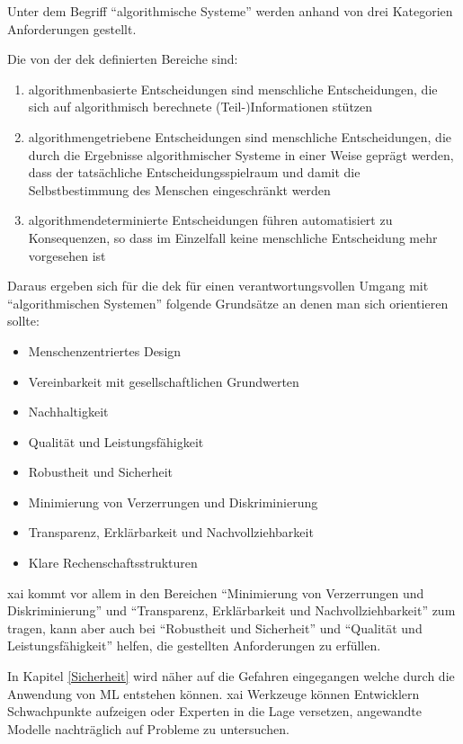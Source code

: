 \documentclass[
  12pt, %
  a4paper, %
  oneside, %
  openany, 
  numbers=noenddot, %
  BCOR=5mm, %
  parskip=half*, %
  thesis, %
]{bfhbook}
\begin{document}
Unter dem Begriff ``algorithmische Systeme'' werden anhand von drei Kategorien Anforderungen gestellt.

 Die von der  \acrshort{dek} definierten Bereiche sind:
 
 \begin{enumerate}
   \item  algorithmenbasierte Entscheidungen sind menschliche Entscheidungen, die sich auf algorithmisch berechnete (Teil-)Informationen stützen
   \item algorithmengetriebene Entscheidungen sind menschliche Entscheidungen, die durch die Ergebnisse algorithmischer Systeme in einer Weise geprägt werden, dass der tatsächliche Entscheidungsspielraum und damit die Selbstbestimmung des Menschen eingeschränkt werden
   \item  algorithmendeterminierte Entscheidungen führen automatisiert zu Konsequenzen, so dass im Einzelfall keine menschliche Entscheidung mehr vorgesehen ist
\end{enumerate}

Daraus ergeben sich für die \acrlong{dek} für einen verantwortungsvollen Umgang mit ``algorithmischen Systemen'' folgende Grundsätze an denen man sich orientieren sollte:

\begin{itemize}
	\item Menschenzentriertes Design
	\item Vereinbarkeit mit gesellschaftlichen Grundwerten
	\item Nachhaltigkeit
	\item Qualität und Leistungsfähigkeit
	\item Robustheit und Sicherheit
	\item Minimierung von Verzerrungen und Diskriminierung
	\item Transparenz, Erklärbarkeit und Nachvollziehbarkeit
	\item Klare Rechenschaftsstrukturen
\end{itemize}

\Gls{xai} kommt vor allem in den Bereichen ``Minimierung von Verzerrungen und Diskriminierung'' und ``Transparenz, Erklärbarkeit und Nachvollziehbarkeit'' zum tragen, kann aber auch bei ``Robustheit und Sicherheit'' und ``Qualität und Leistungsfähigkeit'' helfen, die gestellten Anforderungen zu erfüllen. 

In Kapitel \ref{Sicherheit} wird näher auf die Gefahren eingegangen welche durch die Anwendung von \Gls{ML} entstehen können. 
\Gls{xai} Werkzeuge können Entwicklern Schwachpunkte aufzeigen oder Experten in die Lage versetzen, angewandte Modelle nachträglich auf Probleme zu untersuchen.
\end{document}
